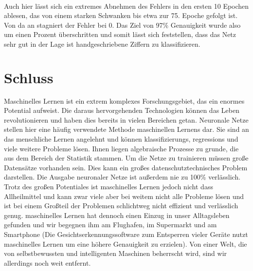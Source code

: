 \documentclass[11pt]{article}
\begin{document}
\\
Auch hier lässt sich ein extremes Abnehmen des Fehlers in den ersten 10 Epochen ablesen, das von einem starken Schwanken bis etwa zur 75. Epoche gefolgt ist. Von da an stagniert der Fehler bei 0. Das Ziel von 97\% Genauigkeit wurde also um einen Prozent überschritten und somit lässt sich feststellen, dass das Netz sehr gut in der Lage ist handgeschriebene Ziffern zu klassifizieren.
\section{Schluss}
Maschinelles Lernen ist ein extrem komplexes Forschungsgebiet, das ein enormes Potential aufweist. Die daraus hervorgehenden Technologien können das Leben revolutionieren und haben dies bereits in vielen Bereichen getan. Neuronale Netze stellen hier eine häufig verwendete Methode maschinellen Lernens dar. Sie sind an das menschliche Lernen angelehnt und können klassifizierungs, regressions und viele weitere Probleme lösen. Ihnen liegen algebraische Prozesse zu grunde, die aus dem Bereich der Statistik stammen. Um die Netze zu trainieren müssen große Datensätze vorhanden sein. Dies kann ein großes datenschutztechnisches Problem darstellen. Die Ausgabe neuronaler Netze ist außerdem nie zu 100\% verlässlich. Trotz des großen Potentiales ist maschinelles Lernen jedoch nicht dass Allheilmittel und kann zwar viele aber bei weitem nicht alle Probleme lösen und ist bei einem Großteil der  Problemen schlichtweg nicht effizient und verlässlich genug. maschinelles Lernen hat dennoch einen Einzug in unser Alltagsleben gefunden und wir begegnen ihm am Flughafen, im Supermarkt und am Smartphone (Die Gesichtserkennungssoftware zum Entsperren vieler Geräte nutzt maschinelles Lernen um eine höhere Genauigkeit zu erzielen). Von einer Welt, die von selbstbewussten und intelligenten Maschinen beherrscht wird, sind wir allerdings noch weit entfernt.
\newpage
\end{document}
